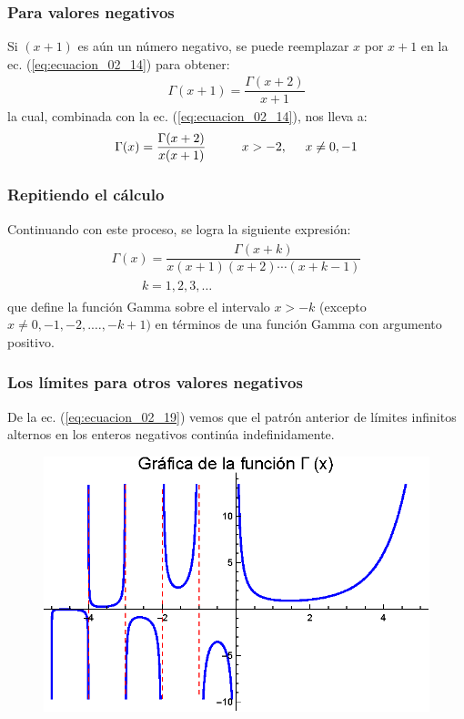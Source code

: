 \documentclass[12pt]{beamer}
\begin{document}
\begin{frame}
\frametitle{Para valores negativos}
Si $(x + 1)$ es aún un número negativo, se puede reemplazar $x$ por $x + 1$ en la ec. (\ref{eq:ecuacion_02_14}) para obtener:
\pause
\begin{align*}
\Gamma (x + 1) = \dfrac{\Gamma (x + 2)}{x + 1}
\end{align*}
\pause
la cual, combinada con la ec. (\ref{eq:ecuacion_02_14}), nos lleva a:
\begin{align*}
\Gamma (x) = \dfrac{\Gamma (x + 2)}{x (x + 1)} \hspace{1cm} x > -2 , \hspace{0.5cm} x \neq 0, -1
\end{align*}
\end{frame}
\begin{frame}
\frametitle{Repitiendo el cálculo}
Continuando con este proceso, se logra la siguiente expresión:
\pause
\begin{align}
\begin{aligned}
\Gamma (x) = \dfrac{\Gamma (x {+} k)}{x (x {+} 1)(x {+} 2) \cdots (x {+} k {-} 1)} \\[0.5em]\hspace{1cm} k = 1, 2, 3, \ldots
\end{aligned}
\label{eq:ecuacion_02_19}
\end{align}
\pause
que define la función Gamma sobre el intervalo $x > -k$ (excepto $x \neq 0, -1, -2, .\ldots , -k + 1)$ en términos de una función Gamma con argumento positivo.
\end{frame}
\begin{frame}
\frametitle{Los límites para otros valores negativos}
De la ec. (\ref{eq:ecuacion_02_19}) vemos que el patrón anterior de límites infinitos alternos en los enteros negativos continúa indefinidamente.
\end{frame}
\begin{frame}[plain]
\begin{figure}[H]
  \centering
  \includegraphics[scale=1.15]{Imagenes/Plot_Gamma_01.eps}
\end{figure}
\end{frame}
\end{document}
